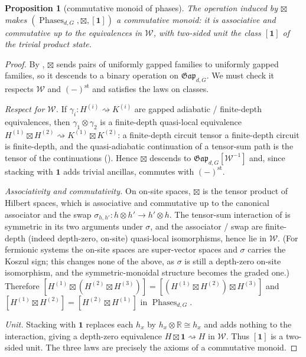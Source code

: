 \documentclass[12pt]{article}
\newcommand{\Gap}{\mathfrak{Gap}}              %
\newcommand{\Phases}{\operatorname{Phases}}    %
\newcommand{\Weq}{\mathcal{W}}                 %
\newcommand{\st}{\mathrm{st}}                  %
\newcommand{\Rp}{\mathbb{R}}
\newcommand{\triv}{\mathbf{1}}               %
\newtheorem{proposition}[proposition]{Proposition}
\theoremstyle{definition}
\theoremstyle{remark}
\theoremstyle{plain}
\begin{document}
\begin{proposition}[commutative monoid of phases]
\label{prop:monoid}
The operation induced by $\boxtimes$ makes $(\Phases_{d,G},\boxtimes,[\triv])$ a
commutative monoid: it is associative and commutative up to the equivalences in
$\Weq$, with two-sided unit the class $[\triv]$ of the trivial product state.
\end{proposition}

\begin{proof}
By , $\boxtimes$ sends pairs of uniformly gapped families to
uniformly gapped families, so it descends to a binary operation on
$\Gap_{d,G}$. We must check it respects $\Weq$ and $(-)^{\st}$ and satisfies the
laws on classes.

\emph{Respect for $\Weq$.} If $\gamma_i:H^{(i)}\rightsquigarrow K^{(i)}$ are
gapped adiabatic / finite-depth equivalences, then
$\gamma_1\otimes\gamma_2$ is a finite-depth quasi-local equivalence
$H^{(1)}\boxtimes H^{(2)}\rightsquigarrow K^{(1)}\boxtimes K^{(2)}$: a
finite-depth circuit tensor a finite-depth circuit is finite-depth, and the
quasi-adiabatic continuation of a tensor-sum path is the tensor of the
continuations (\cite{hastings-wen-qac,bmns-automorphic}). Hence $\boxtimes$
descends to $\Gap_{d,G}[\Weq^{-1}]$ and, since stacking with $\triv$ adds trivial
ancillas, commutes with $(-)^{\st}$.

\emph{Associativity and commutativity.} On on-site spaces, $\boxtimes$ is the
tensor product of Hilbert spaces, which is associative and commutative up to the
canonical associator and the swap $\sigma_{h,h'}:h\otimes h'\to h'\otimes h$. The
tensor-sum interaction of  is symmetric in its two arguments
under $\sigma$, and the associator / swap are finite-depth (indeed depth-zero,
on-site) quasi-local isomorphisms, hence lie in $\Weq$. (For fermionic systems
the on-site spaces are super-vector spaces and $\sigma$ carries the Koszul sign;
this changes none of the above, as $\sigma$ is still a depth-zero on-site
isomorphism, and the symmetric-monoidal structure becomes the graded one.)
Therefore
$[H^{(1)}\boxtimes(H^{(2)}\boxtimes H^{(3)})]
 =[(H^{(1)}\boxtimes H^{(2)})\boxtimes H^{(3)}]$ and
$[H^{(1)}\boxtimes H^{(2)}]=[H^{(2)}\boxtimes H^{(1)}]$ in $\Phases_{d,G}$.

\emph{Unit.} Stacking with $\triv$ replaces each $h_x$ by $h_x\otimes\Rp\cong
h_x$ and adds nothing to the interaction, giving a depth-zero equivalence
$H\boxtimes\triv\rightsquigarrow H$ in $\Weq$. Thus $[\triv]$ is a two-sided
unit. The three laws are precisely the axioms of a commutative monoid.
\end{proof}
\end{document}
